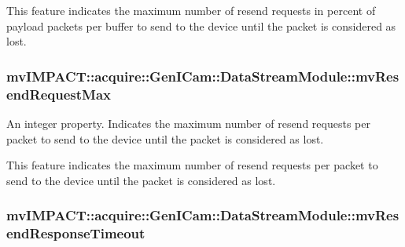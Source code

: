This feature indicates the maximum number of resend requests in percent of payload packets per buffer to send to the device until the packet is considered as lost. \hypertarget{classmv_i_m_p_a_c_t_1_1acquire_1_1_gen_i_cam_1_1_data_stream_module_a94debea1582b53ca02fdb929286313d9}{
\subsubsection[{mv\+Resend\+Request\+Max}]{ mv\+I\+M\+P\+A\+C\+T\+::acquire\+::\+Gen\+I\+Cam\+::\+Data\+Stream\+Module\+::mv\+Resend\+Request\+Max}}\label{classmv_i_m_p_a_c_t_1_1acquire_1_1_gen_i_cam_1_1_data_stream_module_a94debea1582b53ca02fdb929286313d9}


An integer property. Indicates the maximum number of resend requests per packet to send to the device until the packet is considered as lost. 

This feature indicates the maximum number of resend requests per packet to send to the device until the packet is considered as lost. \hypertarget{classmv_i_m_p_a_c_t_1_1acquire_1_1_gen_i_cam_1_1_data_stream_module_a2fc39b5e76055a6f344fb90c3fdb0b0f}{
\subsubsection[{mv\+Resend\+Response\+Timeout}]{ mv\+I\+M\+P\+A\+C\+T\+::acquire\+::\+Gen\+I\+Cam\+::\+Data\+Stream\+Module\+::mv\+Resend\+Response\+Timeout}}\label{classmv_i_m_p_a_c_t_1_1acquire_1_1_gen_i_cam_1_1_data_stream_module_a2fc39b5e76055a6f344fb90c3fdb0b0f}


